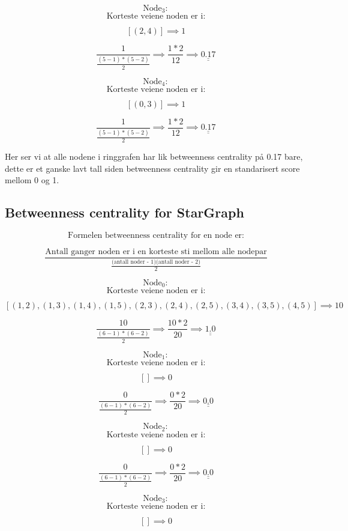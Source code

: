 \documentclass[11pt]{article}
\begin{document}
\[\text{Node}_3:\] \[\text{Korteste veiene noden er i:}\]

\[ [(2, 4)] \implies 1 \]

\[ \frac{1}{\frac{(5-1)*(5-2)}{2}} \implies \frac{1*2}{12} \implies \underline{\underline{ 0.17 }}\]

\[\text{Node}_4:\] \[\text{Korteste veiene noden er i:}\]

\[ [(0, 3)] \implies 1 \]

\[ \frac{1}{\frac{(5-1)*(5-2)}{2}} \implies \frac{1*2}{12} \implies \underline{\underline{ 0.17 }}\]

Her ser vi at alle nodene i ringgrafen har lik betweenness centrality på
0.17 bare, dette er et ganske lavt tall siden betweenness centrality gir
en standarisert score mellom 0 og 1.

    \hypertarget{betweenness-centrality-for-stargraph}{%
\subsection*{Betweenness centrality for
StarGraph}\label{betweenness-centrality-for-stargraph}}

\[\text{Formelen betweenness centrality for en node er:}\]

\[\frac{\text{Antall ganger noden er i en korteste sti mellom alle nodepar}}{\frac{\text{(antall noder - 1)(antall noder - 2)}}{2}}\]

\[\text{Node}_0:\] \[\text{Korteste veiene noden er i:}\]

\[ [(1, 2), (1, 3), (1, 4), (1, 5), (2, 3), (2, 4), (2, 5), (3, 4), (3, 5), (4, 5)] \implies 10 \]

\[ \frac{10}{\frac{(6-1)*(6-2)}{2}} \implies \frac{10*2}{20} \implies \underline{\underline{ 1.0 }}\]

\[\text{Node}_1:\] \[\text{Korteste veiene noden er i:}\]

\[ [] \implies 0 \]

\[ \frac{0}{\frac{(6-1)*(6-2)}{2}} \implies \frac{0*2}{20} \implies \underline{\underline{ 0.0 }}\]

\[\text{Node}_2:\] \[\text{Korteste veiene noden er i:}\]

\[ [] \implies 0 \]

\[ \frac{0}{\frac{(6-1)*(6-2)}{2}} \implies \frac{0*2}{20} \implies \underline{\underline{ 0.0 }}\]

\[\text{Node}_3:\] \[\text{Korteste veiene noden er i:}\]

\[ [] \implies 0 \]
\end{document}
